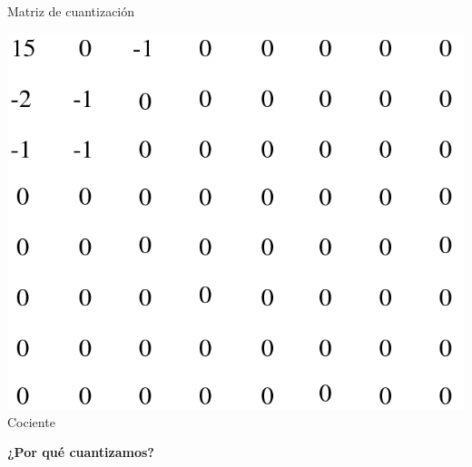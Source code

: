 \documentclass{beamer}
\begin{document}
\begin{frame}
\begin{minipage}[t]{0.3\linewidth}
\begin{center}
            \small Matriz de cuantización
        \end{center}    \end{minipage}
    \hfill
    \begin{minipage}[t]{0.3\linewidth}
        \begin{center}
            \includegraphics[scale=0.175]{fig/quantized.png}\\
            \small Cociente
        \end{center}    \end{minipage}


\end{frame}

\begin{frame}
    \centering \huge \textbf{¿Por qué cuantizamos?}
\end{frame}
\end{document}
